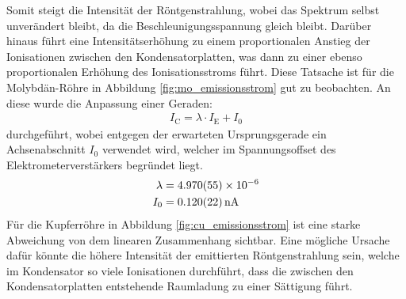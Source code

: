 \documentclass[11pt, a4paper]{article}
\numberwithin{equation}{section}
\begin{document}
Somit steigt die Intensität der Röntgenstrahlung, wobei das Spektrum selbst unverändert bleibt, da die Beschleunigungsspannung gleich bleibt.
Darüber hinaus führt eine Intensitätserhöhung zu einem proportionalen Anstieg der Ionisationen zwischen den Kondensatorplatten, was dann zu einer ebenso proportionalen Erhöhung des Ionisationsstroms führt.
Diese Tatsache ist für die Molybdän-Röhre in Abbildung \ref{fig:mo_emissionsstrom} gut zu beobachten.
An diese wurde die Anpassung einer Geraden:
\begin{align}
	I_\mathrm{C} = \lambda \cdot I_\mathrm{E} + I_0
\end{align}
durchgeführt, wobei entgegen der erwarteten Ursprungsgerade ein Achsenabschnitt $I_0$ verwendet wird, welcher im Spannungsoffset des Elektrometerverstärkers begründet liegt.
\begin{align*}
	\lambda &= \num{4.970 +- 0.055e-6}\\
	I_0 &= \SI{0.120 +- 0.022}{nA}
\end{align*}
Für die Kupferröhre in Abbildung \ref{fig:cu_emissionsstrom} ist eine starke Abweichung von dem linearen Zusammenhang sichtbar.
Eine mögliche Ursache dafür könnte die höhere Intensität der emittierten Röntgenstrahlung sein, welche im Kondensator so viele Ionisationen durchführt, dass die zwischen den Kondensatorplatten entstehende Raumladung zu einer Sättigung führt.
\end{document}
